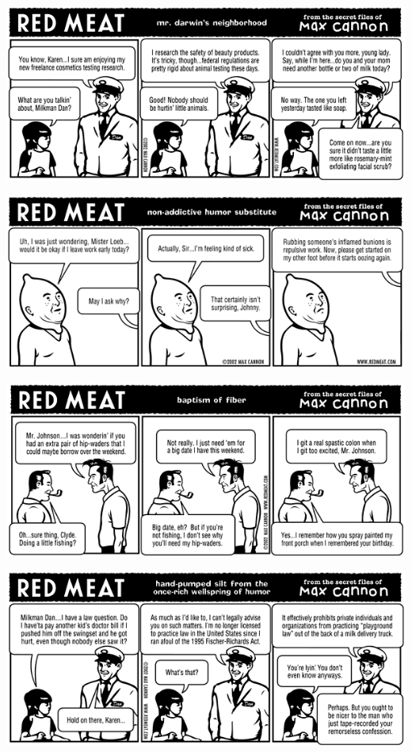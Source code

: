 \documentclass[a4paper,twoside,11pt]{article}
\begin{document}
\includegraphics[width=\textwidth]{redmeat_2002-01-22.png}



\includegraphics[width=\textwidth]{redmeat_2002-01-29.png}



\includegraphics[width=\textwidth]{redmeat_2002-02-05.png}



\includegraphics[width=\textwidth]{redmeat_2002-02-12.png}
\end{document}
